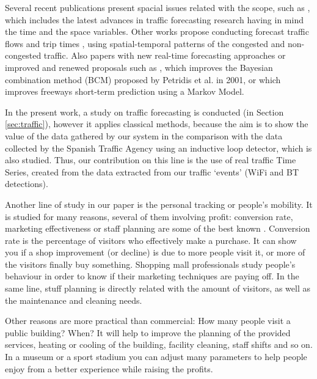 \documentclass[preprint]{elsarticle}
\begin{document}
Several recent publications present spacial issues related with the
scope, such as \cite{Zhang20141}, which includes the latest advances in
traffic forecasting research having in mind the time and the space variables.  
Other works propose conducting forecast traffic flows and trip times
\citep{Dong201420}, \cite{Zou201433} using spatial-temporal patterns
of the congested and non-congested traffic. Also papers with new
real-time forecasting approaches \cite{Zhang201465} or improved and
renewed proposals such as \cite{Wang201479}, which improves the
Bayesian combination method (BCM) proposed by Petridis et al. in 2001,
or \cite{Qi201495} which improves freeways short-term prediction using
a Markov Model. 


In the present work, a study on traffic forecasting is conducted (in Section \ref{sec:traffic}), however it applies classical methods, because the aim is to show the value of the data gathered by our system in the comparison with the data collected by the Spanish Traffic Agency using an inductive loop detector, which is also studied.
Thus, our contribution on this line is the use of real traffic Time Series, created from the data extracted from our traffic `events' (WiFi and BT detections).

Another line of study in our paper is the personal tracking or people's mobility. It is studied for many reasons, several of them involving profit: conversion rate, marketing effectiveness or staff planning are some of the best known \cite{stanton1967fundamentals}. Conversion rate is the percentage of visitors who effectively make a purchase. It can show you if a shop improvement (or decline) is due to more people visit it, or more of the visitors finally buy something. Shopping mall professionals study people's behaviour in order to know if their marketing techniques are paying off. In the same line, stuff planning is directly related with the amount of visitors, as well as the maintenance and cleaning needs.

Other reasons are more practical than commercial: How many people visit a public building? When? It will help to improve the planning of the provided services, heating or cooling of the building, facility cleaning, staff shifts and so on. In a museum or a sport stadium you can adjust many parameters to help people enjoy from a better experience while raising the profits.
\end{document}
